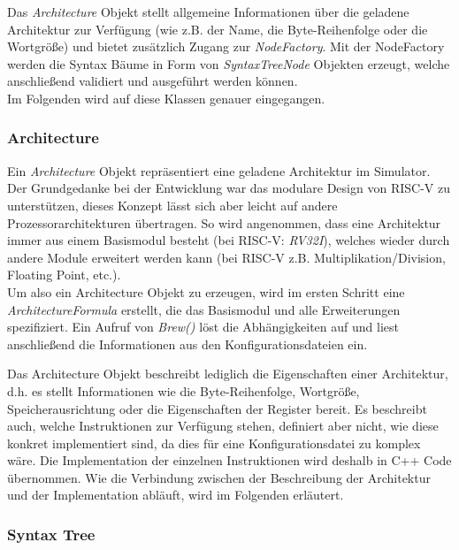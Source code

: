Das \textit{Architecture} Objekt stellt allgemeine Informationen über die
geladene Architektur zur Verfügung (wie z.B. der Name, die Byte-Reihenfolge oder
die Wortgröße) und bietet zusätzlich Zugang zur \textit{NodeFactory}.
Mit der NodeFactory werden die Syntax Bäume in Form von \textit{SyntaxTreeNode}
Objekten erzeugt, welche anschließend validiert und ausgeführt werden können. \\
Im Folgenden wird auf diese Klassen genauer eingegangen.

\subsubsection{Architecture}


Ein \textit{Architecture} Objekt repräsentiert eine geladene Architektur im
Simulator. Der Grundgedanke bei der Entwicklung war das modulare Design von RISC-V
zu unterstützen, dieses Konzept lässt sich aber leicht auf andere Prozessorarchitekturen
übertragen. So wird angenommen, dass eine Architektur immer aus einem Basismodul
besteht (bei RISC-V: \textit{RV32I}), welches wieder durch andere Module erweitert
werden kann (bei RISC-V z.B. Multiplikation/Division, Floating Point, etc.). \\
Um also ein Architecture Objekt zu erzeugen, wird im ersten Schritt eine
\textit{ArchitectureFormula} erstellt, die das Basismodul und alle Erweiterungen
spezifiziert. Ein Aufruf von \textit{Brew()} löst die Abhängigkeiten auf und liest
anschließend die Informationen aus den Konfigurationsdateien ein.

Das Architecture Objekt beschreibt lediglich die Eigenschaften einer Architektur,
d.h. es stellt Informationen wie die Byte-Reihenfolge, Wortgröße, Speicherausrichtung
oder die Eigenschaften der Register bereit. Es beschreibt auch, welche Instruktionen
zur Verfügung stehen, definiert aber nicht, wie diese konkret implementiert sind,
da dies für eine Konfigurationsdatei zu komplex wäre. Die Implementation der
einzelnen Instruktionen wird deshalb in C++ Code übernommen. Wie die Verbindung
zwischen der Beschreibung der Architektur und der Implementation abläuft, wird
im Folgenden erläutert.

\subsubsection{Syntax Tree}

